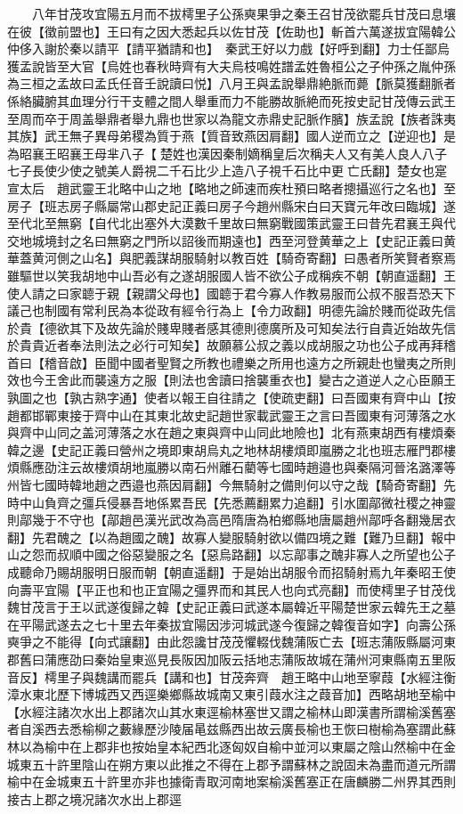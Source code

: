 　　八年甘茂攻宜陽五月而不拔樗里子公孫奭果爭之秦王召甘茂欲罷兵甘茂曰息壤在彼【徵前盟也】王曰有之因大悉起兵以佐甘茂【佐助也】斬首六萬遂拔宜陽韓公仲侈入謝於秦以請平【請平猶請和也】　秦武王好以力戲【好呼到翻】力士任鄙烏獲孟說皆至大官【烏姓也春秋時齊有大夫烏枝鳴姓譜孟姓魯桓公之子仲孫之胤仲孫為三桓之孟故曰孟氏任音壬說讀曰悦】八月王與孟說舉鼎絶脈而薨【脈莫獲翻脈者係絡臟腑其血理分行干支體之間人舉重而力不能勝故脈絶而死按史記甘茂傳云武王至周而卒于周盖舉鼎者舉九鼎也世家以為龍文赤鼎史記脈作臏】族孟說【族者誅夷其族】武王無子異母弟稷為質于燕【質音致燕因肩翻】國人逆而立之【逆迎也】是為昭襄王昭襄王母芈八子【楚姓也漢因秦制嫡稱皇后次稱夫人又有美人良人八子七子長使少使之號美人爵視二千石比少上造八子視千石比中更亡氏翻】楚女也寔宣太后　趙武靈王北略中山之地【略地之師速而疾杜預曰略者摠攝巡行之名也】至房子【班志房子縣屬常山郡史記正義曰房子今趙州縣宋白曰天寶元年改曰臨城】遂至代北至無窮【自代北出塞外大漠數千里故曰無窮戰國策武靈王曰昔先君襄王與代交地城境封之名曰無窮之門所以詔後而期遠也】西至河登黄華之上【史記正義曰黄華蓋黄河側之山名】與肥義謀胡服騎射以教百姓【騎奇寄翻】曰愚者所笑賢者察焉雖驅世以笑我胡地中山吾必有之遂胡服國人皆不欲公子成稱疾不朝【朝直遥翻】王使人請之曰家聼于親【親謂父母也】國聼于君今寡人作教易服而公叔不服吾恐天下議己也制國有常利民為本從政有經令行為上【令力政翻】明德先論於賤而從政先信於貴【德欲其下及故先論於賤卑賤者感其德則德廣所及可知矣法行自貴近始故先信於貴貴近者奉法則法之必行可知矣】故願慕公叔之義以成胡服之功也公子成再拜稽首曰【稽音啟】臣聞中國者聖賢之所教也禮樂之所用也遠方之所親赴也蠻夷之所則效也今王舍此而襲遠方之服【則法也舍讀曰捨襲重衣也】變古之道逆人之心臣願王孰圖之也【孰古熟字通】使者以報王自往請之【使疏吏翻】曰吾國東有齊中山【按趙都邯鄲東接于齊中山在其東北故史記趙世家載武靈王之言曰吾國東有河薄落之水與齊中山同之盖河薄落之水在趙之東與齊中山同此地險也】北有燕東胡西有樓煩秦韓之邊【史記正義曰營州之境即東胡烏丸之地林胡樓煩即嵐勝之北也班志雁門郡樓煩縣應劭注云故樓煩胡地嵐勝以南石州離石藺等七國時趙邉也與秦隔河晉洺潞澤等州皆七國時韓地趙之西邉也燕因肩翻】今無騎射之備則何以守之哉【騎奇寄翻】先時中山負齊之彊兵侵暴吾地係累吾民【先悉薦翻累力追翻】引水圍鄗微社稷之神靈則鄗幾于不守也【鄗趙邑漢光武改為高邑隋唐為柏鄉縣地唐屬趙州鄗呼各翻幾居衣翻】先君醜之【以為趙國之醜】故寡人變服騎射欲以備四境之難【難乃旦翻】報中山之怨而叔順中國之俗惡變服之名【惡烏路翻】以忘鄗事之醜非寡人之所望也公子成聽命乃賜胡服明日服而朝【朝直遥翻】于是始出胡服令而招騎射焉九年秦昭王使向壽平宜陽【平正也和也正宜陽之彊界而和其民人也向式亮翻】而使樗里子甘茂伐魏甘茂言于王以武遂復歸之韓【史記正義曰武遂本屬韓近平陽楚世家云韓先王之墓在平陽武遂去之七十里去年秦拔宜陽因涉河城武遂今復歸之韓復音如字】向壽公孫奭爭之不能得【向式讓翻】由此怨讒甘茂茂懼輟伐魏蒲阪亡去【班志蒲阪縣屬河東郡舊曰蒲應劭曰秦始皇東巡見長阪因加阪云括地志蒲阪故城在蒲州河東縣南五里阪音反】樗里子與魏講而罷兵【講和也】甘茂奔齊　趙王略中山地至寧葭【水經注衡漳水東北歷下博城西又西逕樂鄉縣故城南又東引葭水注之葭音加】西略胡地至榆中【水經注諸次水出上郡諸次山其水東逕榆林塞世又謂之榆林山即漢書所謂榆溪舊塞者自溪西去悉榆柳之藪緣歷沙陵届㫣兹縣西出故云廣長榆也王恢曰樹榆為塞謂此蘇林以為榆中在上郡非也按始皇本紀西北逐匈奴自榆中並河以東屬之陰山然榆中在金城東五十許里陰山在朔方東以此推之不得在上郡予謂蘇林之說固未為盡而道元所謂榆中在金城東五十許里亦非也據衛青取河南地案榆溪舊塞正在唐麟勝二州界其西則接古上郡之境况諸次水出上郡逕